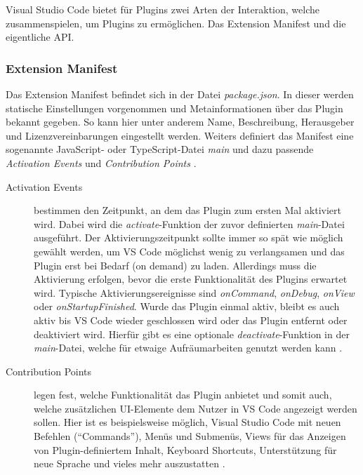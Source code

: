 Visual Studio Code bietet für Plugins zwei Arten der
Interaktion, welche zusammenspielen, um Plugins zu ermöglichen. 
Das Extension Manifest und die eigentliche API.
\subsubsection{Extension Manifest} 
  Das Extension Manifest befindet sich in der Datei \emph{package.json}.
  In dieser werden statische Einstellungen vorgenommen und
  Metainformationen über das Plugin bekannt gegeben. So kann hier unter
  anderem Name, Beschreibung, Herausgeber und Lizenzvereinbarungen
  eingestellt werden. Weiters definiert das Manifest eine sogenannte
  JavaScript- oder TypeScript-Datei \emph{main}  und dazu passende
  \emph{Activation Events} und \emph{Contribution Points}
  \cite{VSCodeExtensionAPIExtensionManifest,VSCodeExtensionAPIExtensionAnatomy}.
  \begin{description}
    \item[Activation Events] bestimmen den Zeitpunkt, an dem das Plugin zum ersten Mal
      aktiviert wird. Dabei wird die \emph{activate}-Funktion der zuvor definierten
      \emph{main}-Datei ausgeführt. Der Aktivierungszeitpunkt sollte immer so spät wie
      möglich gewählt werden, um VS Code möglichst wenig zu verlangsamen und
      das Plugin erst bei Bedarf (on demand) zu laden. Allerdings
      muss die Aktivierung erfolgen, bevor die erste Funktionalität des
      Plugins erwartet wird. Typische Aktivierungsereignisse sind \emph{onCommand}, 
      \emph{onDebug}, \emph{onView} oder \emph{onStartupFinished}.
      Wurde das Plugin einmal aktiv, bleibt es auch aktiv bis VS Code wieder geschlossen
      wird oder das Plugin entfernt oder deaktiviert wird. Hierfür gibt es eine optionale
       \emph{deactivate}-Funktion in der \emph{main}-Datei, welche für etwaige
      Aufräumarbeiten genutzt werden kann
      \cite{VSCodeExtensionAPIActivationEvents,VSCodeExtensionAPIExtensionAnatomy}.
    \item[Contribution Points] legen fest, welche Funktionalität das Plugin anbietet
      und somit auch, welche zusätzlichen UI-Elemente
      dem Nutzer in VS Code angezeigt werden sollen.
      Hier ist es beispielsweise möglich, Visual Studio Code mit neuen Befehlen (\enquote{Commands}),
      Menüs und Submenüs, Views für das Anzeigen von Plugin-definiertem Inhalt,
      Keyboard Shortcuts, Unterstützung für neue Sprache und vieles mehr auszustatten 
      \cite{VSCodeExtensionAPIContributionPoints}.
  \end{description}
